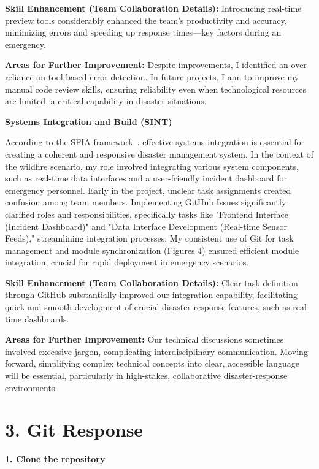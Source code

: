 \documentclass[a4paper, 11pt]{report}
\begin{document}
\textbf{Skill Enhancement (Team Collaboration Details):}  
Introducing real-time preview tools considerably enhanced the team's productivity and accuracy, minimizing errors and speeding up response times—key factors during an emergency.

\textbf{Areas for Further Improvement:}  
Despite improvements, I identified an over-reliance on tool-based error detection. In future projects, I aim to improve my manual code review skills, ensuring reliability even when technological resources are limited, a critical capability in disaster situations.

\textbf{Systems Integration and Build (SINT)}

According to the SFIA framework~\cite{sfia}, effective systems integration is essential for creating a coherent and responsive disaster management system. In the context of the wildfire scenario, my role involved integrating various system components, such as real-time data interfaces and a user-friendly incident dashboard for emergency personnel. Early in the project, unclear task assignments created confusion among team members. Implementing GitHub Issues significantly clarified roles and responsibilities, specifically tasks like "Frontend Interface (Incident Dashboard)" and "Data Interface Development (Real-time Sensor Feeds)," streamlining integration processes. My consistent use of Git for task management and module synchronization (Figures 4) ensured efficient module integration, crucial for rapid deployment in emergency scenarios.

\textbf{Skill Enhancement (Team Collaboration Details):}  
Clear task definition through GitHub substantially improved our integration capability, facilitating quick and smooth development of crucial disaster-response features, such as real-time dashboards.

\textbf{Areas for Further Improvement:}  
Our technical discussions sometimes involved excessive jargon, complicating interdisciplinary communication. Moving forward, simplifying complex technical concepts into clear, accessible language will be essential, particularly in high-stakes, collaborative disaster-response environments.


\newpage

\section*{3. Git Response}

\textbf{1. Clone the repository}
\end{document}
